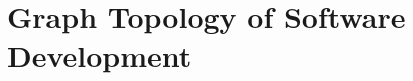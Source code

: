 \documentclass[aspectratio=169,xcolor=table]{beamer}
\begin{document}



    \section{Graph Topology of Software Development}
\end{document}
